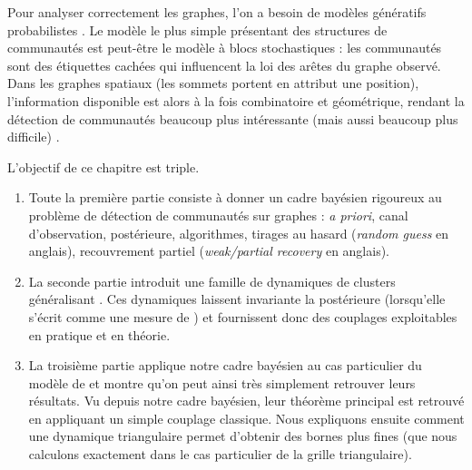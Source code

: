 Pour analyser correctement les graphes, l'on a besoin de modèles génératifs probabilistes \cite{AvrachenkovDreveton2022}.
Le modèle le plus simple présentant des structures de communautés est peut-être le modèle à blocs stochastiques \cite{SBM1983,SBM2011,Abbe2017,PercolationSBM} : les communautés sont des étiquettes cachées qui influencent la loi des arêtes du graphe observé. Dans les graphes spatiaux (les sommets portent en attribut une position), l'information disponible est alors à la fois combinatoire et géométrique, rendant la détection de communautés beaucoup plus intéressante (mais aussi beaucoup plus difficile) \cite{SankararamanBaccelli2018,SankararamanBaccelliAbbe2020, AvrachenkovBobuDreveton2021HigherOrderSpectralGeometric}.

L'objectif de ce chapitre est triple.
\begin{enumerate}
    \item Toute la première partie consiste à donner un cadre bayésien rigoureux au problème de détection de communautés sur graphes : \emph{a priori}, canal d'observation, postérieure, algorithmes, tirages au hasard (\emph{random guess} en anglais), recouvrement partiel (\emph{weak/partial recovery} en anglais). 
    \item La seconde partie introduit une famille de dynamiques de clusters généralisant \SW{} \cite{SwendsenWang,EdwardsSokal}. Ces dynamiques laissent invariante la postérieure (lorsqu'elle s'écrit comme une mesure de ) et fournissent donc des couplages exploitables en pratique et en théorie.
    \item La troisième partie applique notre cadre bayésien au cas particulier du modèle de \SB{} \cite{SankararamanBaccelli2018} et montre qu'on peut ainsi très simplement retrouver leurs résultats. Vu depuis notre cadre bayésien, leur théorème principal est retrouvé en appliquant un simple couplage \SW{} classique. Nous expliquons ensuite comment une dynamique triangulaire permet d'obtenir des bornes plus fines (que nous calculons exactement dans le cas particulier de la grille triangulaire).
\end{enumerate}



